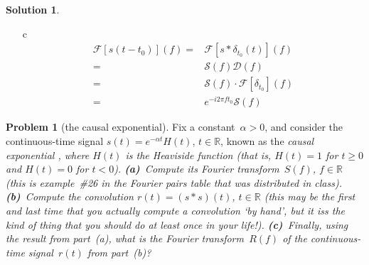 \documentclass[11pt]{article}
\theoremstyle{plain}
\theoremstyle{definition}
\newtheorem{problem}{Problem}
\newtheorem{solution}{Solution}
\theoremstyle{remark}
\begin{document}
\begin{solution}
\begin{enumerate}
		\item[c]
		\begin{eqnarray*}
		\mathcal{F}[s(t-t_0)] (f) = & \mathcal{F}[s*\delta_{t_0}(t)](f) \\
		= & \mathcal{S}(f) \mathcal{D}(f)\\
		= & \mathcal{S}(f) \cdot \mathcal{F}[\delta_{t_0}](f) \\
		= & e^{-i2\pi f t_0} \mathcal{S}(f)
		\end{eqnarray*}
		
	\end{enumerate}

\end{solution}
\begin{problem}[the causal exponential]
Fix a constant~$\alpha>0$,
and consider the continuous-time 
signal
$s(t)=e^{-\alpha t}H(t)$, $t\in\mathbb{R}$,
known as the \em causal
exponential \em\/,
where $H(t)$ is the Heaviside function
(that is, $H(t)=1$ 
for $t\geq0$ and $H(t)=0$ for $t<0$).
{\bf(a)}~Compute its Fourier transform~$S(f)$, $f\in\mathbb{R}$
(this is example~\#26 in the Fourier pairs table that was 
distributed in class).
{\bf(b)}~Compute the convolution 
$r(t)=(s\ast s)(t)$, $t\in \mathbb{R}$
(this may be the first and last
time that you actually compute a convolution `by hand', but it iss the 
kind of thing that you should do at least 
once in your life!).
{\bf(c)}~Finally, using the result from part~{(a)},
what is the Fourier transform~$R(f)$ of the 
continuous-time signal~$r(t)$ from part~(b)? 
\end{problem}
\end{document}
